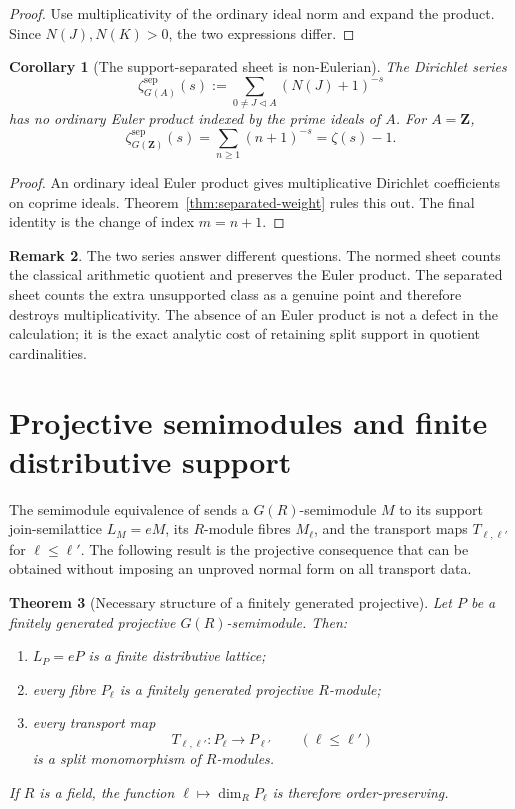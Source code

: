 \documentclass[11pt]{amsart}
\numberwithin{equation}{section}
\newtheorem{theorem}{Theorem}[section]
\newtheorem{corollary}[theorem]{Corollary}
\theoremstyle{definition}
\newtheorem{remark}[theorem]{Remark}
\newcommand{\Z}{\mathbf Z}
\begin{document}
\begin{proof}
Use multiplicativity of the ordinary ideal norm and expand the product.
Since $N(J),N(K)>0$, the two expressions differ.
\end{proof}

\begin{corollary}[The support-separated sheet is non-Eulerian]
\label{cor:separated-non-eulerian}
The Dirichlet series
\[
\zeta^{\mathrm{sep}}_{G(A)}(s)
:=\sum_{0\ne J\triangleleft A}(N(J)+1)^{-s}
\]
has no ordinary Euler product indexed by the prime ideals of $A$.
For $A=\Z$,
\[
\zeta^{\mathrm{sep}}_{G(\Z)}(s)=\sum_{n\geq1}(n+1)^{-s}=\zeta(s)-1.
\]
\end{corollary}

\begin{proof}
An ordinary ideal Euler product gives multiplicative Dirichlet
coefficients on coprime ideals.  Theorem~\ref{thm:separated-weight} rules
this out.  The final identity is the change of index $m=n+1$.
\end{proof}

\begin{remark}
The two series answer different questions.  The normed sheet counts the
classical arithmetic quotient and preserves the Euler product.  The
separated sheet counts the extra unsupported class as a genuine point and
therefore destroys multiplicativity.  The absence of an Euler product is
not a defect in the calculation; it is the exact analytic cost of retaining
split support in quotient cardinalities.
\end{remark}

\section{Projective semimodules and finite distributive support}
\label{sec:projective-semimodules}

The semimodule equivalence of \cite{Secondary} sends a $G(R)$-semimodule
$M$ to its support join-semilattice $L_M=eM$, its $R$-module fibres
$M_\ell$, and the transport maps $T_{\ell,\ell'}$ for
$\ell\leq\ell'$.  The following result is the projective consequence that
can be obtained without imposing an unproved normal form on all transport
data.

\begin{theorem}[Necessary structure of a finitely generated projective]
\label{thm:projective-support-structure}
Let $P$ be a finitely generated projective $G(R)$-semimodule.  Then:
\begin{enumerate}[label=\textup{(\roman*)}]
\item $L_P=eP$ is a finite distributive lattice;
\item every fibre $P_\ell$ is a finitely generated projective $R$-module;
\item every transport map
\[
T_{\ell,\ell'}:P_\ell\longrightarrow P_{\ell'}
\qquad(\ell\leq\ell')
\]
is a split monomorphism of $R$-modules.
\end{enumerate}
If $R$ is a field, the function
$\ell\mapsto\dim_R P_\ell$ is therefore order-preserving.
\end{theorem}
\end{document}
